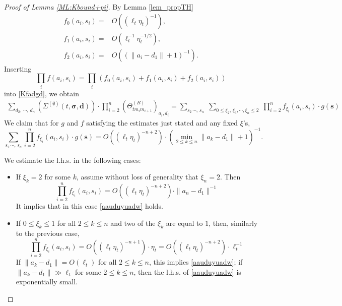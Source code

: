 \documentclass[10pt,reqno]{article}
\theoremstyle{plain} %
\theoremstyle{remark}
\numberwithin{equation}{section}
\begin{document}
\begin{proof}[Proof of Lemma  \ref{ML:Kbound+pi}]
By Lemma \ref{lem_propTH}
\begin{align}
f_0(a_i,s_i)=&O((\ell_t\eta_t)^{-1}), 
\\\nonumber
f_1(a_i,s_i)=&O(\ell_t^{-1}\eta_t^{-1/2}),
\\\nonumber
f_2(a_i,s_i)=&O((\|a_i-d_1\|+1)^{-1}) .
\end{align}
Inserting 
$$\prod_if(a_i,s_i)=\prod_i \left(f_0(a_i,s_i)+f_1(a_i,s_i)+f_2(a_i,s_i)\right)$$
into \eqref{Kfadgd}, we obtain 
\begin{align} \label{Kfs2dgd}
 \sum_{d_2,\,\cdots,\, d_n}\left(\Sigma^{(\emptyset)}(t, \boldsymbol{\sigma}, \textbf{d})\right)
\cdot 
\prod_{i=2}^n \left(\Theta^{(B)}_{tm_im_{i+1}}\right)_{a_i, d_i}
= 
\sum_{s_2\,\cdots,\,s_n}\;  \sum_{0\le \xi_2, \,\xi_3, \cdots,  \xi_n \le 2 }\;  \prod_{i=2}^nf_{\xi_i}(a_i, s_i)\cdot g(\textbf{s})
\end{align}
 We claim that for $g$ and $f$ satisfying the estimates just stated and  any fixed $\xi$'s, 
\begin{equation}\label{aauduyuadw}
\sum_{s_2\,\cdots,\,s_n}    \prod_{i=2}^nf_{\xi_i}(a_i, s_i)\cdot g(\textbf{s})= O((\ell_t\eta_t)^{-n+2})\cdot \left(\min_{2\le k\le n} \|a_k-d_1\|+1\right)^{-1} .
\end{equation}


We estimate the l.h.s. in the following cases: 
\begin{itemize}
    \item If $\xi_k=2$ for some $k$, assume without loss of generality that $\xi_n=2$. Then 
    $$
     \prod_{i=2}^nf_{\xi_i}(a_i, s_i)=O\left((\ell_t\eta_t)^{-n+2}\right)\cdot  \|a_n-d_1\|^{-1}
    $$
    It implies that in this case \eqref{aauduyuadw} holds.  
  
\item If $0\le \xi_k\le 1$ for all $2\le k\le n$ and two of the $\xi_k$ are equal to $1$, then, similarly to the previous case, 
$$
    \prod_{i=2}^nf_{\xi_i}(a_i, s_i)=O\left((\ell_t\eta_t)^{-n+1}\right)\cdot \eta_t
    =O\left((\ell_t\eta_t)^{-n+2}\right)\cdot \ell_t^{-1}
    $$
 If $\|a_k-d_1\|=O(\ell_t)$ for all $2 \le k \le n$, this  implies  \eqref{aauduyuadw};   if $\|a_k-d_1\|\gg \ell_t$ for some $2 \le k \le n$, then the l.h.s. of \eqref{aauduyuadw} is  exponentially small. 


\end{itemize}
\end{proof}
\end{document}
